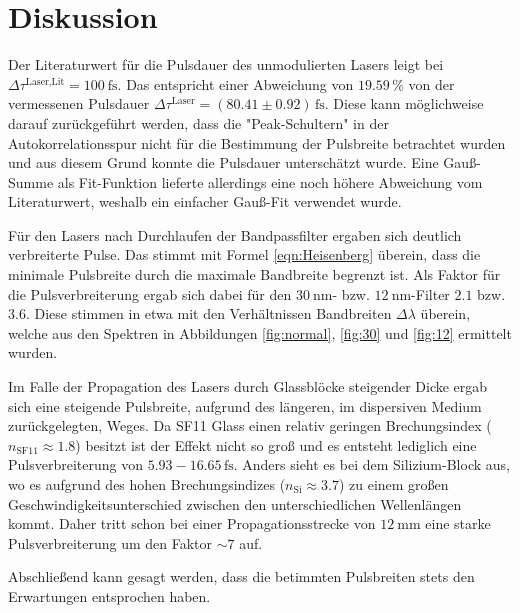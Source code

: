 \newpage
\section{Diskussion}    
\label{sec:Dis}
    Der Literaturwert für die Pulsdauer des unmodulierten Lasers leigt bei $\Delta \tau^{\text{Laser,Lit}}=\SI{100}{\femto\second}$. Das entspricht einer Abweichung von $19.59\,\%$ von der vermessenen Pulsdauer $\Delta \tau^{\text{Laser}} = (80.41\pm 0.92)\,\text{fs}$. Diese kann möglichweise darauf zurückgeführt werden, dass die "Peak-Schultern" in der Autokorrelationsspur nicht für die Bestimmung der Pulsbreite betrachtet wurden und aus diesem Grund konnte die Pulsdauer unterschätzt wurde.
    Eine Gauß-Summe als Fit-Funktion lieferte allerdings eine noch höhere Abweichung vom Literaturwert, weshalb ein einfacher Gauß-Fit verwendet wurde.

    Für den Lasers nach Durchlaufen der Bandpassfilter ergaben sich deutlich verbreiterte Pulse. Das stimmt mit Formel \ref{eqn:Heisenberg} überein, dass die minimale Pulsbreite durch die maximale Bandbreite begrenzt ist. Als Faktor für die Pulsverbreiterung ergab sich dabei für den $\SI{30}{\nano\metre}$- bzw. $\SI{12}{\nano\metre}$-Filter $2.1$ bzw. $3.6$. Diese stimmen in etwa mit den Verhältnissen Bandbreiten $\Delta\lambda$ überein, welche aus den Spektren in Abbildungen \ref{fig:normal}, \ref{fig:30} und \ref{fig:12} ermittelt wurden.

    Im Falle der Propagation des Lasers durch Glassblöcke steigender Dicke ergab sich eine steigende Pulsbreite, aufgrund des längeren, im dispersiven Medium zurückgelegten, Weges. Da SF11 Glass einen relativ geringen Brechungsindex ($n_{\text{SF11}}\approx 1.8$) besitzt ist der Effekt nicht so groß und es entsteht lediglich eine Pulsverbreiterung von $5.93 - 16.65 \,\text{fs}$. Anders sieht es bei dem Silizium-Block aus, wo es aufgrund des hohen Brechungsindizes ($n_{\text{Si}}\approx 3.7$) zu einem großen Geschwindigkeitsunterschied zwischen den unterschiedlichen Wellenlängen kommt. Daher tritt schon bei einer Propagationsstrecke von $\SI{12}{\milli\metre}$ eine starke Pulsverbreiterung um den Faktor $\sim 7$ auf.

    Abschließend kann gesagt werden, dass die betimmten Pulsbreiten stets den Erwartungen entsprochen haben.
